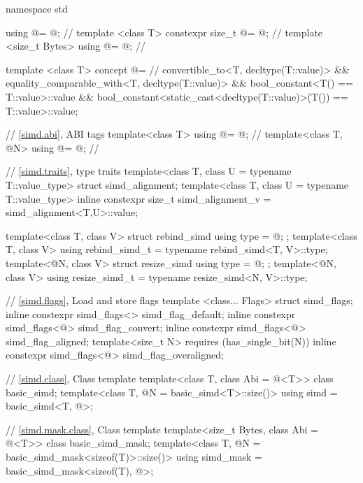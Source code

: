 \begin{codeblock}
namespace std {
  using @\simdsizetype@ = @\seebelow@; // \expos
  template <class T> constexpr size_t @\maskelementsize@ = @\seebelow@; // \expos
  template <size_t Bytes> using @\integerfrom@ = @\seebelow@; // \expos

  template <class T>
    concept @\constexprwrapperlike@ =                     // \expos
      convertible_to<T, decltype(T::value)> &&
      equality_comparable_with<T, decltype(T::value)> &&
      bool_constant<T() == T::value>::value &&
      bool_constant<static_cast<decltype(T::value)>(T()) == T::value>::value;

  // \ref{simd.abi},  ABI tags
  template<class T> using @\nativeabi@ = @\seebelow@; // \expos
  template<class T, @\simdsizetype@ N> using @\deducet@ = @\seebelow@; // \expos

  // \ref{simd.traits},  type traits
  template<class T, class U = typename T::value_type> struct simd_alignment;
  template<class T, class U = typename T::value_type>
    inline constexpr size_t simd_alignment_v = simd_alignment<T,U>::value;

  template<class T, class V> struct rebind_simd { using type = @\seebelow@; };
  template<class T, class V> using rebind_simd_t = typename rebind_simd<T, V>::type;
  template<@\simdsizetype@ N, class V> struct resize_simd { using type = @\seebelow@; };
  template<@\simdsizetype@ N, class V> using resize_simd_t = typename resize_simd<N, V>::type;

  // \ref{simd.flags}, Load and store flags
  template <class... Flags> struct simd_flags;
  inline constexpr simd_flags<> simd_flag_default{};
  inline constexpr simd_flags<@\seebelow@> simd_flag_convert{};
  inline constexpr simd_flags<@\seebelow@> simd_flag_aligned{};
  template<size_t N> requires (has_single_bit(N))
    inline constexpr simd_flags<@\seebelow@> simd_flag_overaligned{};

  // \ref{simd.class}, Class template 
  template<class T, class Abi = @\nativeabi@<T>> class basic_simd;
  template<class T, @\simdsizetype@ N = basic_simd<T>::size()>
    using simd = basic_simd<T, @>;

  // \ref{simd.mask.class}, Class template 
  template<size_t Bytes, class Abi = @\nativeabi@<T>> class basic_simd_mask;
  template<class T, @\simdsizetype@ N = basic_simd_mask<sizeof(T)>::size()>
    using simd_mask = basic_simd_mask<sizeof(T), @>;

}
\end{codeblock}
